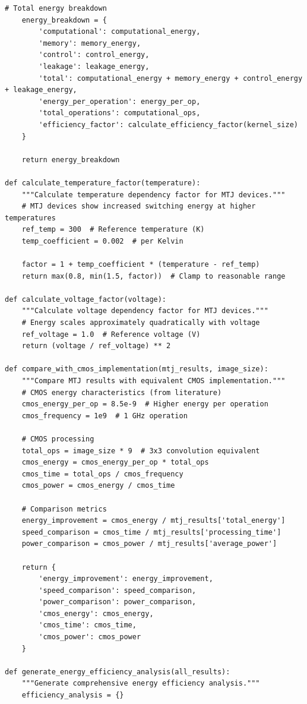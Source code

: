 \documentclass[conference]{IEEEtran}
\begin{document}
\begin{lstlisting}[caption={Comprehensive energy consumption calculation with device modeling}]
    # Total energy breakdown
    energy_breakdown = {
        'computational': computational_energy,
        'memory': memory_energy,
        'control': control_energy,
        'leakage': leakage_energy,
        'total': computational_energy + memory_energy + control_energy + leakage_energy,
        'energy_per_operation': energy_per_op,
        'total_operations': computational_ops,
        'efficiency_factor': calculate_efficiency_factor(kernel_size)
    }
    
    return energy_breakdown

def calculate_temperature_factor(temperature):
    """Calculate temperature dependency factor for MTJ devices."""
    # MTJ devices show increased switching energy at higher temperatures
    ref_temp = 300  # Reference temperature (K)
    temp_coefficient = 0.002  # per Kelvin
    
    factor = 1 + temp_coefficient * (temperature - ref_temp)
    return max(0.8, min(1.5, factor))  # Clamp to reasonable range

def calculate_voltage_factor(voltage):
    """Calculate voltage dependency factor for MTJ devices."""
    # Energy scales approximately quadratically with voltage
    ref_voltage = 1.0  # Reference voltage (V)
    return (voltage / ref_voltage) ** 2

def compare_with_cmos_implementation(mtj_results, image_size):
    """Compare MTJ results with equivalent CMOS implementation."""
    # CMOS energy characteristics (from literature)
    cmos_energy_per_op = 8.5e-9  # Higher energy per operation
    cmos_frequency = 1e9  # 1 GHz operation
    
    # CMOS processing
    total_ops = image_size * 9  # 3x3 convolution equivalent
    cmos_energy = cmos_energy_per_op * total_ops
    cmos_time = total_ops / cmos_frequency
    cmos_power = cmos_energy / cmos_time
    
    # Comparison metrics
    energy_improvement = cmos_energy / mtj_results['total_energy']
    speed_comparison = cmos_time / mtj_results['processing_time']
    power_comparison = cmos_power / mtj_results['average_power']
    
    return {
        'energy_improvement': energy_improvement,
        'speed_comparison': speed_comparison, 
        'power_comparison': power_comparison,
        'cmos_energy': cmos_energy,
        'cmos_time': cmos_time,
        'cmos_power': cmos_power
    }

def generate_energy_efficiency_analysis(all_results):
    """Generate comprehensive energy efficiency analysis."""
    efficiency_analysis = {}
    

\end{lstlisting}
\end{document}

